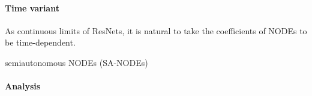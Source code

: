 \documentclass{article}
\theoremstyle{definition} \newtheorem{definition}{Definition}
\theoremstyle{remark} \newtheorem{remark}{Remark}
\newcounter{ct}
\begin{document}

\paragraph{Time variant}
As continuous limits of ResNets, it is natural to take the coefficients of NODEs to be time-dependent.

semiautonomous NODEs (SA-NODEs) \citep{li2024universal}


\paragraph{Analysis}
\citep{massaroli2020nodes}


%
%
%
%
\end{document}
